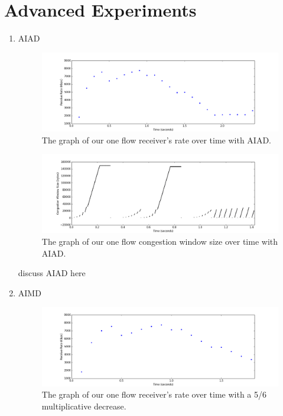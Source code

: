 \documentclass[11pt]{article}
\begin{document}
\section{Advanced Experiments}

\begin{enumerate}
\item AIAD

\begin{figure}[H]
\caption{The graph of our one flow receiver's rate over time with AIAD.}
  \label{figure13}
    \centering
    \includegraphics[width=\linewidth]{1f_rateAIAD.png}
\end{figure}

\begin{figure}[H]
\caption{The graph of our one flow congestion window size over time with AIAD.}
  \label{figure14}
    \centering
    \includegraphics[width=\linewidth]{1f_windowAIAD.png}
\end{figure}


discuss AIAD here

\bigskip
\item AIMD

\begin{figure}[H]
\caption{The graph of our one flow receiver's rate over time with a 5/6 multiplicative decrease.}
  \label{figure15}
    \centering
    \includegraphics[width=\linewidth]{1f_rateAIMD.png}
\end{figure}


\end{enumerate}
\end{document}
